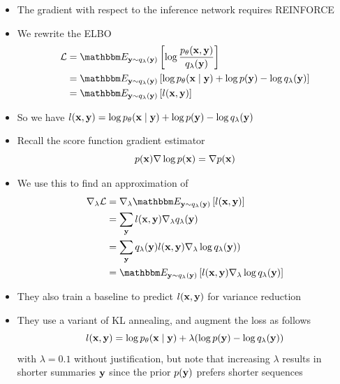 \begin{frame}
\begin{center}
\end{center}
\begin{itemize}
\item The gradient with respect to the inference network requires REINFORCE
\item We rewrite the ELBO
\begin{align}
\mathcal{L} &= \E{\by\sim q_\lambda(\by)}{\log \frac{p_\theta(\bx,\by)}{q_\lambda(\by)}}\\
&= \E{\by\sim q_\lambda(\by)}{\log p_\theta(\bx\mid\by) + \log p(\by) - \log q_\lambda(\by)}\\
&= \E{\by\sim q_\lambda(\by)}{l(\bx,\by)}
\end{align}
\item So we have $l(\mathbf{x}, \mathbf{y}) = \log p_\theta(\mathbf{x}\mid\mathbf{y}) + \log p(\mathbf{y}) - \log q_\lambda(\mathbf{y})$
\end{itemize}
\end{frame}

\begin{frame}
\begin{center}
\end{center}
\begin{itemize}
\item Recall the score function gradient estimator
\begin{equation}
p(\mathbf{x})\nabla \log p(\mathbf{x}) = \nabla p(\mathbf{x})
\end{equation}
\item We use this to find an approximation of 
\begin{align}
\nabla_\lambda \mathcal{L} &= \nabla_\lambda\E{\by\sim q_\lambda(\by)}{l(\bx,\by)}\\
&= \sum_\by l(\bx,\by)\nabla_\lambda q_\lambda(\by)\\
&= \sum_\by q_\lambda(\by)l(\bx,\by)\nabla_\lambda\log q_\lambda(\by) )\\
&= \E{\by\sim q_\lambda(\by)}{l(\bx,\by) \nabla_\lambda\log q_\lambda(\by)}
\end{align}
\end{itemize}
\end{frame}

\begin{frame}
\begin{center}
\end{center}
\begin{itemize}
\item They also train a baseline to predict $l(\mathbf{x},\mathbf{y})$ for variance reduction
\item They use a variant of KL annealing, and augment the loss as follows
$$l(\mathbf{x}, \mathbf{y}) = \log p_\theta(\mathbf{x}\mid\mathbf{y}) + \lambda(\log p(\mathbf{y}) - \log q_\lambda(\mathbf{y}))$$
with $\lambda = 0.1$ without justification, but note that increasing $\lambda$ results
in shorter summaries $\mathbf{y}$ since the prior $p(\mathbf{y})$ prefers shorter sequences
\end{itemize}
\end{frame}


